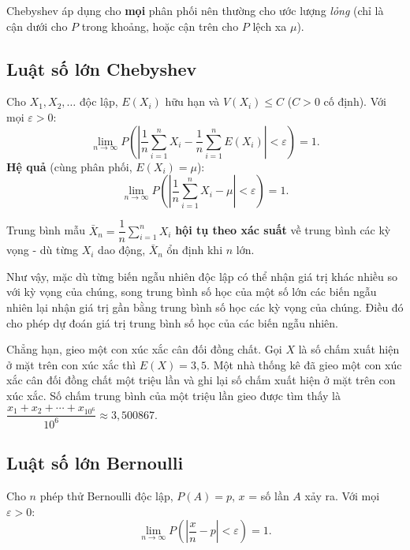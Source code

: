 \documentclass[12pt,a4paper]{article}
\begin{document}
\begin{luuy}[title={Ưu và nhược điểm}]
Chebyshev áp dụng cho \textbf{mọi} phân phối nên thường cho ước lượng \emph{lỏng} (chỉ là cận dưới cho $P$ trong khoảng, hoặc cận trên cho $P$ lệch xa $\mu$).
\end{luuy}

\subsection{Luật số lớn Chebyshev}

\begin{dinhly}[title={Luật số lớn Chebyshev}]
Cho $X_1, X_2, \ldots$ độc lập, $E(X_i)$ hữu hạn và $V(X_i) \le C$ ($C > 0$ cố định). Với mọi $\varepsilon > 0$:
\[
  \lim_{n \to \infty} P\!\left(\left|\dfrac{1}{n}\sum_{i=1}^n X_i - \dfrac{1}{n}\sum_{i=1}^n E(X_i)\right| < \varepsilon\right) = 1.
\]
\textbf{Hệ quả} (cùng phân phối, $E(X_i) = \mu$):
\[
  \lim_{n \to \infty} P\!\left(\left|\dfrac{1}{n}\sum_{i=1}^n X_i - \mu\right| < \varepsilon\right) = 1.
\]
\end{dinhly}

\begin{luuy}[title={Ý nghĩa}]
Trung bình mẫu $\bar{X}_n = \dfrac{1}{n}\sum_{i=1}^n X_i$ \textbf{hội tụ theo xác suất} về trung bình các kỳ vọng - dù từng $X_i$ dao động, $\bar{X}_n$ ổn định khi $n$ lớn.

Như vậy, mặc dù từng biến ngẫu nhiên độc lập có thể nhận giá trị khác nhiều so với kỳ vọng của chúng, song trung bình số học của một số lớn các biến ngẫu nhiên lại nhận giá trị gần bằng trung bình số học các kỳ vọng của chúng. Điều đó cho phép dự đoán giá trị trung bình số học của các biến ngẫu nhiên.

Chẳng hạn, gieo một con xúc xắc cân đối đồng chất. Gọi $X$ là số chấm xuất hiện ở mặt trên con xúc xắc thì $E(X) = 3,5$. Một nhà thống kê đã gieo một con xúc xắc cân đối đồng chất một triệu lần và ghi lại số chấm xuất hiện ở mặt trên con xúc xắc. Số chấm trung bình của một triệu lần gieo được tìm thấy là $\dfrac{x_1 + x_2 + \cdots + x_{10^6}}{10^6} \approx 3,500867$.
\end{luuy}

\subsection{Luật số lớn Bernoulli}

\begin{dinhly}[title={Luật số lớn Bernoulli}]
Cho $n$ phép thử Bernoulli độc lập, $P(A) = p$, $x$ = số lần $A$ xảy ra. Với mọi $\varepsilon > 0$:
\[
  \lim_{n \to \infty} P\!\left(\left|\dfrac{x}{n} - p\right| < \varepsilon\right) = 1.
\]
\end{dinhly}
\end{document}
